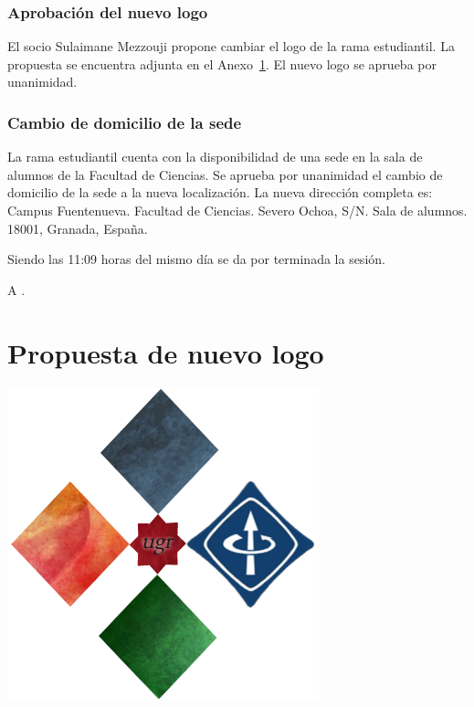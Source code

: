 \documentclass[12pt,twoside,openany,a4paper]{book}
\begin{document}
    \subsection{Aprobación del nuevo logo}
    El socio Sulaimane Mezzouji propone cambiar el logo de la rama estudiantil. La propuesta se encuentra adjunta en el Anexo~\ref{app:logo}. El nuevo logo se aprueba por unanimidad.

    \subsection{Cambio de domicilio de la sede}
    La rama estudiantil cuenta con la disponibilidad de una sede en la sala de alumnos de la Facultad de Ciencias. Se aprueba por unanimidad el cambio de domicilio de la sede a la nueva localización. La nueva dirección completa es: Campus Fuentenueva. Facultad de Ciencias. Severo Ochoa, S/N. Sala de alumnos. 18001, Granada, España.

    \clearpage
    Siendo las 11:09 horas del mismo día se da por terminada la sesión.

    A \Date.
    \vspace{10mm}

    \appendix
    \chapter{Propuesta de nuevo logo}
    \label{app:logo}
    \includegraphics{./extra_29sept2015_appendix1.png}
\end{document}
